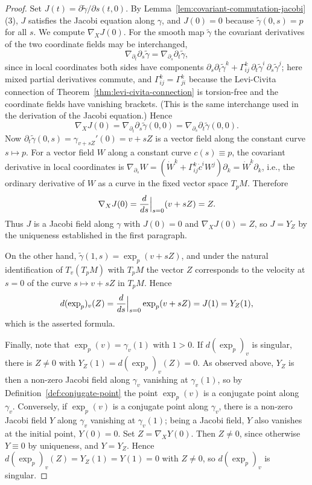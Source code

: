 \begin{proof}
Set $J(t)=\partial\tilde\gamma/\partial s(t,0)$. By
Lemma~\ref{lem:covariant-commutation-jacobi}(3), $J$ satisfies the Jacobi
equation along $\gamma$, and $J(0)=0$ because $\tilde\gamma(0,s)=p$
for all $s$. We compute $\nabla_XJ(0)$. For the smooth map
$\tilde\gamma$ the covariant derivatives of the two coordinate
fields may be interchanged,
$$\nabla_{\partial_t}\partial_s\tilde\gamma
=\nabla_{\partial_s}\partial_t\tilde\gamma,$$
since in local coordinates both sides have components
$\partial_s\partial_t\tilde\gamma^k
+\Gamma^k_{ij}\,\partial_t\tilde\gamma^i\,\partial_s\tilde\gamma^j$;
here mixed partial derivatives commute, and
$\Gamma^k_{ij}=\Gamma^k_{ji}$ because the Levi-Civita connection of
Theorem~\ref{thm:levi-civita-connection} is torsion-free and the
coordinate fields have vanishing brackets. (This is the same
interchange used in the derivation of the Jacobi equation.) Hence
$$\nabla_XJ(0)=\nabla_{\partial_t}\partial_s\tilde\gamma(0,0)
=\nabla_{\partial_s}\partial_t\tilde\gamma(0,0).$$
Now $\partial_t\tilde\gamma(0,s)=\gamma_{v+sZ}'(0)=v+sZ$ is a
vector field along the constant curve $s\mapsto p$. For a vector
field $W$ along a constant curve $c(s)\equiv p$, the covariant
derivative in local coordinates is
$\nabla_{\partial_s}W=(\dot W^k+\Gamma^k_{ij}\dot c^iW^j)
\partial_k=\dot W^k\partial_k$, i.e., the ordinary derivative of
$W$ as a curve in the fixed vector space $T_pM$. Therefore
$$\nabla_XJ(0)=\frac{d}{ds}\Bigl|_{s=0}\Bigr.(v+sZ)=Z.$$
Thus $J$ is a Jacobi field along $\gamma$ with $J(0)=0$ and
$\nabla_XJ(0)=Z$, so $J=Y_Z$ by the uniqueness established in the
first paragraph.

On the other hand, $\tilde\gamma(1,s)=\exp_p(v+sZ)$, and under the
natural identification of $T_v(T_pM)$ with $T_pM$ the vector $Z$
corresponds to the velocity at $s=0$ of the curve $s\mapsto v+sZ$
in $T_pM$. Hence
$$d(\exp_p)_v(Z)=\frac{d}{ds}\Bigl|_{s=0}\Bigr.\exp_p(v+sZ)
=J(1)=Y_Z(1),$$
which is the asserted formula.

Finally, note that $\exp_p(v)=\gamma_v(1)$ with $1>0$. If
$d(\exp_p)_v$ is singular, there is $Z\neq0$ with
$Y_Z(1)=d(\exp_p)_v(Z)=0$. As observed above, $Y_Z$ is then a
non-zero Jacobi field along $\gamma_v$ vanishing at $\gamma_v(1)$,
so by Definition~\ref{def:conjugate-point} the point $\exp_p(v)$
is a conjugate point along $\gamma_v$. Conversely, if $\exp_p(v)$
is a conjugate point along $\gamma_v$, there is a non-zero Jacobi
field $Y$ along $\gamma_v$ vanishing at $\gamma_v(1)$; being a
Jacobi field, $Y$ also vanishes at the initial point, $Y(0)=0$.
Set $Z=\nabla_XY(0)$. Then $Z\neq0$, since otherwise $Y\equiv0$ by
uniqueness, and $Y=Y_Z$. Hence
$d(\exp_p)_v(Z)=Y_Z(1)=Y(1)=0$ with $Z\neq0$, so $d(\exp_p)_v$ is
singular.
\end{proof}

